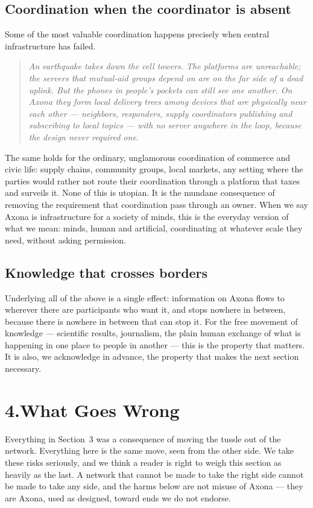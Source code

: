 \documentclass[nobib,justified]{tufte-handout}
\newcommand{\pullquote}[1]{%
  \begin{quote}\itshape\color{rust} #1 \end{quote}}
\begin{document}
\subsection{Coordination when the coordinator is absent}

Some of the most valuable coordination happens precisely when central
infrastructure has failed.

\pullquote{An earthquake takes down the cell towers. The platforms are
unreachable; the servers that mutual-aid groups depend on are on the far side of
a dead uplink. But the phones in people's pockets can still see one another. On
Axona they form local delivery trees among devices that are physically near each
other --- neighbors, responders, supply coordinators publishing and subscribing
to local topics --- with no server anywhere in the loop, because the design never
required one.}

The same holds for the ordinary, unglamorous coordination of commerce and civic
life: supply chains, community groups, local markets, any setting where the
parties would rather not route their coordination through a platform that taxes
and surveils it. None of this is utopian. It is the mundane consequence of
removing the requirement that coordination pass through an owner. When we say
Axona is infrastructure for a society of minds, this is the everyday version of
what we mean: minds, human and artificial, coordinating at whatever scale they
need, without asking permission.

\subsection{Knowledge that crosses borders}

Underlying all of the above is a single effect: information on Axona flows to
wherever there are participants who want it, and stops nowhere in between,
because there is nowhere in between that can stop it. For the free movement of
knowledge --- scientific results, journalism, the plain human exchange of what is
happening in one place to people in another --- this is the property that
matters. It is also, we acknowledge in advance, the property that makes the next
section necessary.

\section{4.\quad What Goes Wrong}

Everything in Section~3 was a consequence of moving the tussle out of the
network. Everything here is the same move, seen from the other side. We take
these risks seriously, and we think a reader is right to weigh this section as
heavily as the last. A network that cannot be made to take the right side cannot
be made to take any side, and the harms below are not misuse of Axona --- they
are Axona, used as designed, toward ends we do not endorse.
\end{document}
